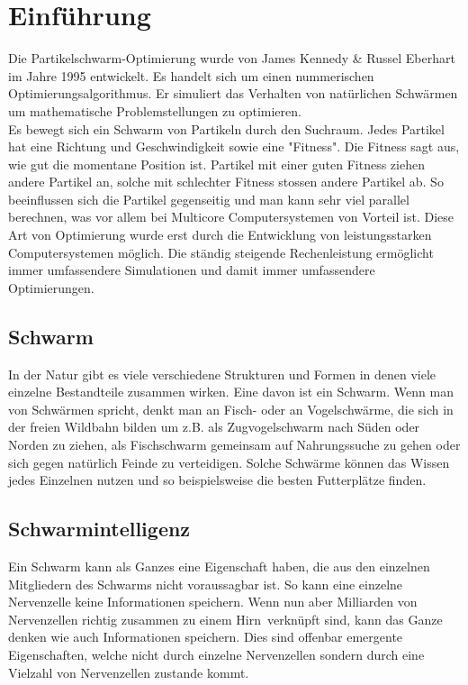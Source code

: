 \section{Einführung}
		Die Partikelschwarm-Optimierung wurde von James Kennedy \& Russel Eberhart im Jahre 1995 entwickelt. Es handelt sich um einen nummerischen Optimierungsalgorithmus. Er simuliert das Verhalten von natürlichen Schwärmen um mathematische Problemstellungen zu optimieren.\\
		
		Es bewegt sich ein Schwarm von Partikeln durch den Suchraum. Jedes Partikel hat eine Richtung und Geschwindigkeit sowie eine "Fitness". Die Fitness sagt aus, wie gut die momentane Position ist. Partikel mit einer guten Fitness ziehen andere Partikel an, solche mit schlechter Fitness stossen andere Partikel ab. So beeinflussen sich die Partikel gegenseitig und man kann sehr viel parallel berechnen, was vor allem bei Multicore Computersystemen von Vorteil ist.
		Diese Art von Optimierung wurde erst durch die Entwicklung von leistungsstarken Computersystemen möglich. Die ständig steigende Rechenleistung ermöglicht immer umfassendere Simulationen und damit immer umfassendere Optimierungen.
		\subsection{Schwarm}
		In der Natur gibt es viele verschiedene Strukturen und Formen in denen viele einzelne Bestandteile zusammen wirken. Eine davon ist ein Schwarm.
		Wenn man von Schwärmen spricht, denkt man an Fisch- oder an Vogelschwärme, die sich in der freien Wildbahn  bilden um z.B. als Zugvogelschwarm nach Süden oder Norden zu ziehen, als Fischschwarm gemeinsam auf Nahrungssuche zu gehen oder sich gegen natürlich Feinde zu verteidigen. Solche Schwärme können das Wissen jedes Einzelnen nutzen und so beispielsweise die besten Futterplätze finden.
		\subsection{Schwarmintelligenz}
		Ein Schwarm kann als Ganzes eine Eigenschaft haben, die aus den einzelnen Mitgliedern des Schwarms nicht voraussagbar ist. So kann eine einzelne Nervenzelle keine Informationen speichern. Wenn nun aber Milliarden von Nervenzellen richtig zusammen zu einem \textacutedbl Hirn\textacutedbl \ verknüpft sind, kann das Ganze denken wie auch Informationen speichern. Dies sind offenbar emergente Eigenschaften, welche nicht durch einzelne Nervenzellen sondern durch eine Vielzahl von Nervenzellen zustande kommt.
		\cite{partice-swarm-optimization}
